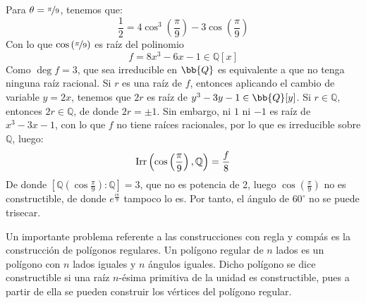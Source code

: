\begin{ejemplo}
    Para $\theta = \nicefrac{\pi}{9}$, tenemos que:
    \begin{equation*}
        \dfrac{1}{2} = 4\cos^3\left(\frac{\pi}{9}\right) - 3\cos\left(\frac{\pi}{9}\right)
    \end{equation*}
    Con lo que $\cos\left(\nicefrac{\pi}{9}\right)$ es raíz del polinomio
    \begin{equation*}
        f = 8x^3-6x-1 \in \mathbb{Q}[x]
    \end{equation*}
    Como $\deg f=3$, que sea irreducible en $\bb{Q}$ es equivalente a que no tenga ninguna raíz racional. Si $r$ es una raíz de $f$, entonces aplicando el cambio de variable $y=2x$, tenemos que $2r$ es raíz de $y^3-3y-1\in \bb{Q}[y]$. Si $r\in \mathbb{Q}$, entonces $2r\in \mathbb{Q}$, de donde $2r=\pm 1$. Sin embargo, ni $1$ ni $-1$ es raíz de $x^3-3x-1$, con lo que $f$ no tiene raíces racionales, por lo que es irreducible sobre $\mathbb{Q}$, luego:
    \begin{equation*}
        \operatorname{Irr}\left(\cos\left(\frac{\pi}{9}\right), \mathbb{Q}\right) = \frac{f}{8}
    \end{equation*}
    De donde $[\mathbb{Q}\left(\cos\frac{\pi}{9}\right) : \mathbb{Q}] = 3$, que no es potencia de 2, luego $\cos\left(\frac{\pi}{9}\right)$ no es constructible, de donde $e^{\frac{i\pi}{9}}$ tampoco lo es. Por tanto, el ángulo de $60^\circ$ no se puede trisecar.
\end{ejemplo}

\label{parte:construcciones_regla_compas_i}
Un importante problema referente a las construcciones con regla y compás es la construcción de polígonos regulares. Un polígono regular de $n$ lados es un polígono con $n$ lados iguales y $n$ ángulos iguales. Dicho polígono se dice constructible si una raíz $n$-ésima primitiva de la unidad es constructible, pues a partir de ella se pueden construir los vértices del polígono regular.\\

